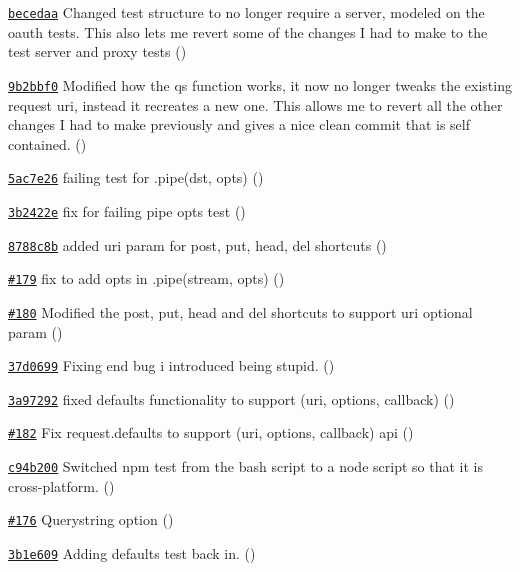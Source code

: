 \begin{DoxyItemize}
\item \href{https://github.com/mikeal/request/commit/becedaaa7681b0c4ad5c0a9b9922fc950f091af2}{\tt becedaa} Changed test structure to no longer require a server, modeled on the oauth tests. This also lets me revert some of the changes I had to make to the test server and proxy tests ()
\item \href{https://github.com/mikeal/request/commit/9b2bbf0c12e87a59320efac67759041cd4af913f}{\tt 9b2bbf0} Modified how the qs function works, it now no longer tweaks the existing request uri, instead it recreates a new one. This allows me to revert all the other changes I had to make previously and gives a nice clean commit that is self contained. ()
\item \href{https://github.com/mikeal/request/commit/5ac7e26ce4f7bf5a334df91df83699891171c0ae}{\tt 5ac7e26} failing test for .pipe(dst, opts) ()
\item \href{https://github.com/mikeal/request/commit/3b2422e62fbd6359b841e59a2c1888db71a22c2c}{\tt 3b2422e} fix for failing pipe opts test ()
\item \href{https://github.com/mikeal/request/commit/8788c8b8cba96662e9d94a96eb04d96b904adea3}{\tt 8788c8b} added uri param for post, put, head, del shortcuts ()
\item \href{https://github.com/mikeal/request/pull/179}{\tt \#179} fix to add opts in .pipe(stream, opts) ()
\item \href{https://github.com/mikeal/request/pull/180}{\tt \#180} Modified the post, put, head and del shortcuts to support uri optional param ()
\item \href{https://github.com/mikeal/request/commit/37d0699eb681e85b7df4896b0a68b6865e596cb3}{\tt 37d0699} Fixing end bug i introduced being stupid. ()
\item \href{https://github.com/mikeal/request/commit/3a97292f45273fa2cc937c0698ba19964780b4bb}{\tt 3a97292} fixed defaults functionality to support (uri, options, callback) ()
\item \href{https://github.com/mikeal/request/pull/182}{\tt \#182} Fix request.\+defaults to support (uri, options, callback) api ()
\item \href{https://github.com/mikeal/request/commit/c94b200258fa48697e386121a3e114ab7bed2ecf}{\tt c94b200} Switched npm test from the bash script to a node script so that it is cross-\/platform. ()
\item \href{https://github.com/mikeal/request/pull/176}{\tt \#176} Querystring option ()
\item \href{https://github.com/mikeal/request/commit/3b1e6094451e8d34c93353177de9d76e9a805e43}{\tt 3b1e609} Adding defaults test back in. ()

\end{DoxyItemize}
